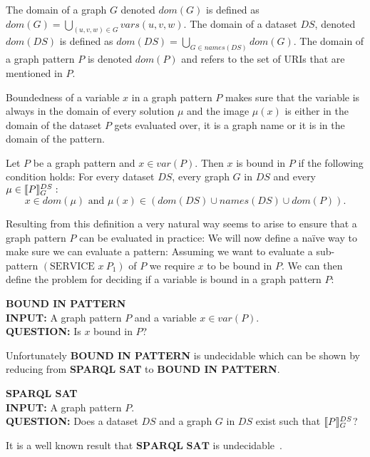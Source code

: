 \begin{definition}
    The domain of a graph $G$ denoted $dom(G)$ is defined as $dom(G) = \bigcup\limits_{(u,v,w) \in G}
    vars(u,v,w)$. The domain of a dataset $DS$, denoted $dom(DS)$ is defined as
    $dom(DS) = \bigcup\limits_{G \in names(DS)} dom(G)$.
    The domain of a graph pattern $P$ is denoted $dom(P)$ and refers to the set of URIs that are
mentioned in $P$.
\end{definition}

Boundedness of a variable $x$ in a graph pattern $P$ makes sure that the
variable is always in the domain of every solution $\mu$ and the image $\mu(x)$ is either in the 
domain of the dataset $P$ gets evaluated over, it is a graph name or it is in the domain of the pattern.

\begin{definition}
Let $P$ be a graph pattern and $x \in var(P)$. Then $x$ is bound in $P$ if the
following condition holds:
For every dataset $DS$, every graph $G$ in $DS$ 
and every $\mu \in \llbracket P \rrbracket^{DS}_G:$\\
\[ x \in dom(\mu) \mbox{ and } \mu(x) \in (dom(DS) \cup names(DS) \cup dom(P)). \]
\end{definition}

Resulting from this definition a very natural way seems to arise to ensure that
a graph pattern $P$ can be evaluated in practice: 
We will now define a na\"ive way to make sure we can evaluate a pattern:
Assuming we want to evaluate a sub-pattern $(\mbox{SERVICE } x \ P_1)$ of $P$
we require $x$ to be bound in $P$. We can then define the problem for deciding if a variable
is bound in a graph pattern $P$:

\begin{framed}\noindent \textbf{BOUND IN PATTERN}\\
	\textbf{INPUT:} A graph pattern $P$ and a variable $x \in var(P)$.\\
	\textbf{QUESTION:} Is $x$ bound in $P$?
\end{framed}
Unfortunately \textbf{BOUND IN PATTERN} is undecidable which can be shown by
reducing from \textbf{SPARQL SAT} to \textbf{BOUND IN PATTERN}.
\begin{framed}\noindent \textbf{SPARQL SAT}\\
	\textbf{INPUT:} A graph pattern $P$.\\
	\textbf{QUESTION:} Does a dataset $DS$ and a graph $G$ in $DS$ exist such
	that $\llbracket P \rrbracket^{DS}_G$?
\end{framed}
It is a well known result that $\textbf{SPARQL SAT}$ is undecidable~\cite{angles2008expressive}.

